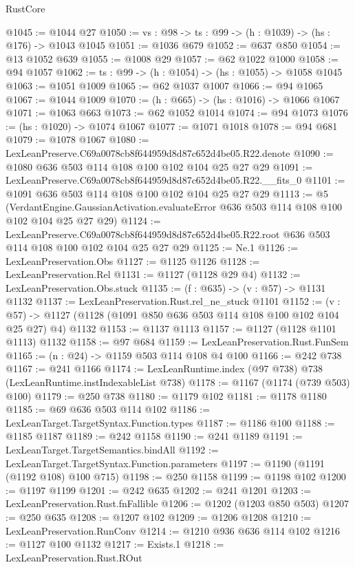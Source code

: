 \begin{lexlean}{RustCore}
\begin{coremodule}
@1045 := @1044 @27
@1050 := {vs : @98} -> {ts : @99} -> (h : @1039) -> (hs : @176) -> @1043 @1045
@1051 := @1036 @679
@1052 := @637 @850
@1054 := @13 @1052 @639
@1055 := @1008 @29
@1057 := @62 @1022 @1000
@1058 := @94 @1057
@1062 := {ts : @99} -> (h : @1054) -> (hs : @1055) -> @1058 @1045
@1063 := @1051 @1009
@1065 := @62 @1037 @1007
@1066 := @94 @1065
@1067 := @1044 @1009
@1070 := (h : @665) -> (hs : @1016) -> @1066 @1067
@1071 := @1063 @663
@1073 := @62 @1052 @1014
@1074 := @94 @1073
@1076 := (hs : @1020) -> @1074 @1067
@1077 := @1071 @1018
@1078 := @94 @681
@1079 := @1078 @1067
@1080 := LexLeanPreserve.C69a0078cb8f644959d8d87c652d4be05.R22.denote
@1090 := @1080 @636 @503 @114 @108 @100 @102 @104 @25 @27 @29
@1091 := LexLeanPreserve.C69a0078cb8f644959d8d87c652d4be05.R22.__fits_0
@1101 := @1091 @636 @503 @114 @108 @100 @102 @104 @25 @27 @29
@1113 := @5
    (VerdantEngine.GaussianActivation.evaluateError @636 @503 @114 @108 @100 @102 @104 @25 @27 @29)
@1124 := LexLeanPreserve.C69a0078cb8f644959d8d87c652d4be05.R22.root
    @636
    @503
    @114
    @108
    @100
    @102
    @104
    @25
    @27
    @29
@1125 := Ne.{1}
@1126 := LexLeanPreservation.Obs
@1127 := @1125 @1126
@1128 := LexLeanPreservation.Rel
@1131 := @1127 (@1128 @29 @4)
@1132 := LexLeanPreservation.Obs.stuck
@1135 := (f : @635) -> (v : @57) -> @1131 @1132
@1137 := LexLeanPreservation.Rust.rel_ne_stuck @1101
@1152 := (v : @57) -> @1127 (@1128 (@1091 @850 @636 @503 @114 @108 @100 @102 @104 @25 @27) @4) @1132
@1153 := @1137 @1113
@1157 := @1127 (@1128 @1101 @1113) @1132
@1158 := @97 @684
@1159 := LexLeanPreservation.Rust.FunSem
@1165 := (n : @24) -> @1159 @503 @114 @108 @4 @100
@1166 := @242 @738
@1167 := @241 @1166
@1174 := LexLeanRuntime.index (@97 @738) @738 (LexLeanRuntime.instIndexableList @738)
@1178 := @1167 (@1174 (@739 @503) @100)
@1179 := @250 @738
@1180 := @1179 @102
@1181 := @1178 @1180
@1185 := @69 @636 @503 @114 @102
@1186 := LexLeanTarget.TargetSyntax.Function.types
@1187 := @1186 @100
@1188 := @1185 @1187
@1189 := @242 @1158
@1190 := @241 @1189
@1191 := LexLeanTarget.TargetSemantics.bindAll
@1192 := LexLeanTarget.TargetSyntax.Function.parameters
@1197 := @1190 (@1191 (@1192 @108) @100 @715)
@1198 := @250 @1158
@1199 := @1198 @102
@1200 := @1197 @1199
@1201 := @242 @635
@1202 := @241 @1201
@1203 := LexLeanPreservation.Rust.fnFallible
@1206 := @1202 (@1203 @850 @503)
@1207 := @250 @635
@1208 := @1207 @102
@1209 := @1206 @1208
@1210 := LexLeanPreservation.RunConv
@1214 := @1210 @936 @636 @114 @102
@1216 := @1127 @100 @1132
@1217 := Exists.{1}
@1218 := LexLeanPreservation.Rust.ROut

\end{coremodule}
\end{lexlean}
